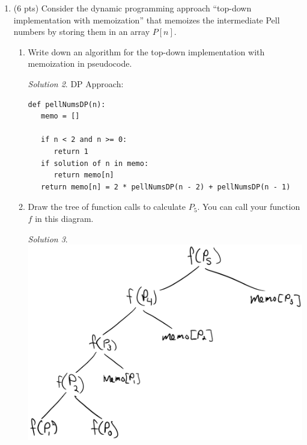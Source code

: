 \documentclass[12pt]{article}
\theoremstyle{remark}
\newtheorem*{solution}{Solution}
\begin{document}
\begin{enumerate}
\begin{enumerate}
\begin{enumerate}
	\item Write down the recurrence for the running time $T(n)$ of the algorithm.\\
	\begin{solution}
T(n) = 2T(n - 1) + T(n - 2) + $\Theta(1)$ $\in$ $O(2^n)$
    \end{solution}

	\end{enumerate}
		
	\item \label{q:3:memfib} (6 pts) Consider the dynamic programming approach ``top-down implementation with memoization'' that memoizes the intermediate Pell numbers by storing them in an array $P[n]$. 
		
	\begin{enumerate}
	\item Write down an algorithm for the top-down implementation with memoization in pseudocode.  \\
	\begin{solution}
DP Approach: \\
\begin{verbatim}
def pellNumsDP(n):
   memo = []
   
   if n < 2 and n >= 0:
      return 1
   if solution of n in memo:
      return memo[n]
   return memo[n] = 2 * pellNumsDP(n - 2) + pellNumsDP(n - 1)
\end{verbatim}
    \end{solution}
	
	\item Draw the tree of function calls to calculate $P_5$. You can call your function $f$ in this diagram.\\
	\begin{solution}
\includegraphics[scale=0.5]{PS9b-Q1b.png} 
    \end{solution}
\pagebreak


\end{enumerate}
\end{enumerate}
\end{enumerate}
\end{document}
